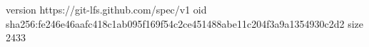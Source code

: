 version https://git-lfs.github.com/spec/v1
oid sha256:fe246e46aafc418c1ab095f169f54c2ce451488abe11c204f3a9a1354930c2d2
size 2433
